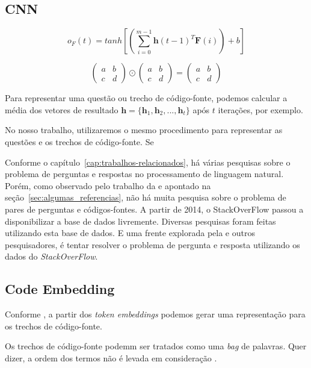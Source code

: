 \subsection{CNN}

\begin{equation}
    o_{F}(t) = tanh \left[\left(\sum_{i=0}^{m - 1} \bm{h}(t-1)^{T}\bm{F}(i)\right) + b\right]
\end{equation}

$$
\begin{pmatrix} 
a & b \\
c & d 
\end{pmatrix}
\odot
\begin{pmatrix} 
a & b \\
c & d 
\end{pmatrix}
=
\begin{pmatrix} 
a & b \\
c & d 
\end{pmatrix}
$$

Para representar uma questão ou trecho de código-fonte, podemos calcular a média dos vetores de resultado $\bm{h} = \{ \bm{h}_{1}, \bm{h}_{2}, . . ., \bm{h}_t \}$ após $t$ iterações, por exemplo.


No nosso trabalho, utilizaremos o mesmo procedimento para representar as questões e os trechos de código-fonte. Se




Conforme o capítulo~\ref{cap:trabalhos-relacionados}, há várias pesquisas sobre o problema de perguntas e respostas no processamento de linguagem natural. Porém, como observado pelo trabalho da \cite{yao-2018} e apontado na seção~\ref{sec:algumas_referencias}, não há muita pesquisa sobre o problema de pares de perguntas e códigos-fontes. A partir de 2014, o StackOverFlow passou a disponibilizar a base de dados livremente. Diversas pesquisas foram feitas utilizando esta base de dados. E uma frente explorada pela \cite{yao-2018} e outros pesquisadores, é tentar resolver o problema de pergunta e resposta utilizando os dados do \textit{StackOverFlow}.

\subsection{Code Embedding}

Conforme \cite{cambronero-deep-learning-code-search:2019}, a partir dos \textit{token embeddings} podemos gerar uma representação para os trechos de código-fonte.

Os trechos de código-fonte podemm ser tratados como uma \textit{bag} de palavras. Quer dizer, a ordem dos termos não é levada em consideração \citep{cambronero-deep-learning-code-search:2019}.

